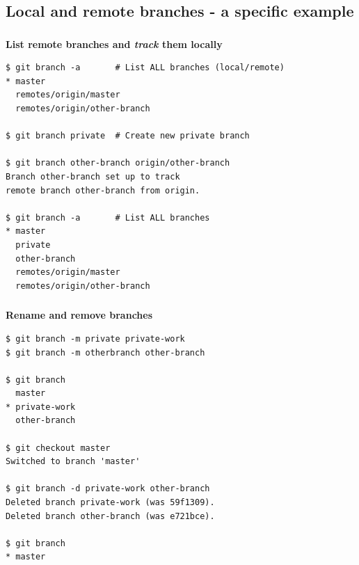 
\subsection{Local and remote branches - a specific example}
\begin{frame}[fragile]
  \frametitle{\insertsubsection}
  \textbf{List remote branches and \textit{track} them locally}
  \begin{small}
\begin{verbatim}
$ git branch -a       # List ALL branches (local/remote)
* master
  remotes/origin/master
  remotes/origin/other-branch

$ git branch private  # Create new private branch

$ git branch other-branch origin/other-branch
Branch other-branch set up to track
remote branch other-branch from origin.

$ git branch -a       # List ALL branches
* master
  private
  other-branch
  remotes/origin/master
  remotes/origin/other-branch
\end{verbatim}
  \end{small}
\end{frame}


\begin{frame}[fragile]
  \frametitle{\insertsubsection}

  \textbf{Rename and remove branches}
  \begin{small}
\begin{verbatim}
$ git branch -m private private-work
$ git branch -m otherbranch other-branch

$ git branch
  master
* private-work
  other-branch

$ git checkout master
Switched to branch 'master'

$ git branch -d private-work other-branch
Deleted branch private-work (was 59f1309).
Deleted branch other-branch (was e721bce).

$ git branch
* master
\end{verbatim}
  \end{small}
\end{frame}


